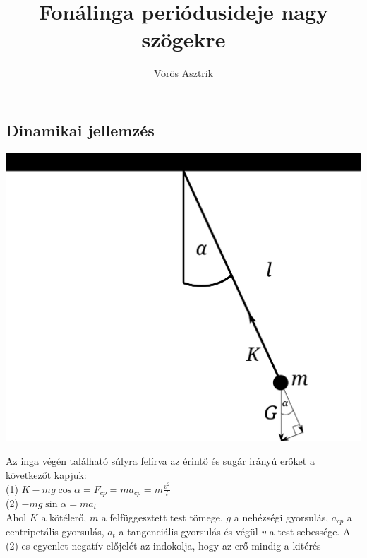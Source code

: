\documentclass{article}
\title{Fonálinga periódusideje nagy szögekre}
\author{Vörös Asztrik}
\date{}
\begin{document}
\maketitle


\begin{multicols}{2}

\section{Dinamikai jellemzés}
	\begin{center}
		\includegraphics[width=\linewidth]{images/pendulum.pdf}
	\end{center}
	Az inga végén található súlyra felírva az érintő és sugár
	irányú erőket a következőt kapjuk:\\
	(1) $K - mg\cos\alpha = F_{cp} = ma_{cp} = m\frac{v^2}{l}$ \\
	(2) $-mg\sin\alpha = ma_{t}$ \\
	Ahol $K$ a kötélerő, $m$ a felfüggesztett test tömege, $g$ a
	nehézségi gyorsulás, $a_{cp}$ a centripetális gyorsulás, $a_{t}$ a
	tangenciális gyorsulás és végül $v$ a test sebessége. A (2)-es
	egyenlet negatív előjelét az indokolja, hogy az erő mindig a kitérés

\end{multicols}
\end{document}
